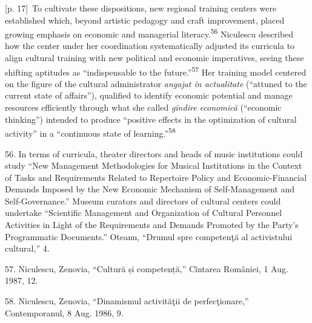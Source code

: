 \documentclass[10pt,a4paper]{article}
\begin{document}
{\scriptsize\color{gray} [p. 17]}\ To cultivate these dispositions, new regional training centers were established which, beyond artistic pedagogy and craft improvement, placed growing emphasis on economic and managerial literacy.\nobreak\textsuperscript{56} Niculescu described how the center under her coordination systematically adjusted its curricula to align cultural training with new political and economic imperatives, seeing these shifting aptitudes as “indispensable to the future.”\nobreak\textsuperscript{57} Her training model centered on the figure of the cultural administrator \textit{angajat în actualitate} (“attuned to the current state of affairs”), qualified to identify economic potential and manage resources efficiently through what she called \textit{gîndire economică} (“economic thinking”) intended to produce “positive effects in the optimization of cultural activity” in a “continuous state of learning.”\nobreak\textsuperscript{58}\par{\small 56. In terms of curricula, theater directors and heads of music institutions could study “New Management Methodologies for Musical Institutions in the Context of Tasks and Requirements Related to Repertoire Policy and Economic-Financial Demands Imposed by the New Economic Mechanism of Self-Management and Self-Governance.” Museum curators and directors of cultural centers could undertake “Scientific Management and Organization of Cultural Personnel Activities in Light of the Requirements and Demands Promoted by the Party’s Programmatic Documents.” Oteanu, “Drumul spre competenţă al activistului cultural,” 4.\par}{\small 57. Niculescu, Zenovia, “Cultură și competență,” Cîntarea României, 1 Aug. 1987, 12.\par}{\small 58. Niculescu, Zenovia, “Dinamismul activităţii de perfecţionare,” Contemporanul, 8 Aug. 1986, 9.\par}
\end{document}
